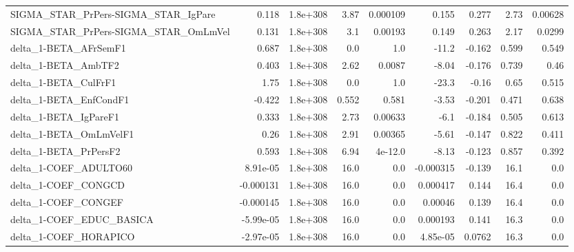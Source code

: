 \begin{tabular}{lrrrrrrrr}
SIGMA\_STAR\_PrPers-SIGMA\_STAR\_IgPare   &       0.118 &     1.8e+308 &    3.87 & 0.000109 &      0.155 &       0.277 &         2.73 &       0.00628 \\
SIGMA\_STAR\_PrPers-SIGMA\_STAR\_OmLmVel  &       0.131 &     1.8e+308 &     3.1 &  0.00193 &      0.149 &       0.263 &         2.17 &        0.0299 \\
delta\_1-BETA\_AFrSemF1                 &       0.687 &     1.8e+308 &     0.0 &      1.0 &      -11.2 &      -0.162 &        0.599 &         0.549 \\
delta\_1-BETA\_AmbTF2                   &       0.403 &     1.8e+308 &    2.62 &   0.0087 &      -8.04 &      -0.176 &        0.739 &          0.46 \\
delta\_1-BETA\_CulFrF1                  &        1.75 &     1.8e+308 &     0.0 &      1.0 &      -23.3 &       -0.16 &         0.65 &         0.515 \\
delta\_1-BETA\_EnfCondF1                &      -0.422 &     1.8e+308 &   0.552 &    0.581 &      -3.53 &      -0.201 &        0.471 &         0.638 \\
delta\_1-BETA\_IgPareF1                 &       0.333 &     1.8e+308 &    2.73 &  0.00633 &       -6.1 &      -0.184 &        0.505 &         0.613 \\
delta\_1-BETA\_OmLmVelF1                &        0.26 &     1.8e+308 &    2.91 &  0.00365 &      -5.61 &      -0.147 &        0.822 &         0.411 \\
delta\_1-BETA\_PrPersF2                 &       0.593 &     1.8e+308 &    6.94 &  4e-12.0 &      -8.13 &      -0.123 &        0.857 &         0.392 \\
delta\_1-COEF\_ADULTO60                 &    8.91e-05 &     1.8e+308 &    16.0 &      0.0 &  -0.000315 &      -0.139 &         16.1 &           0.0 \\
delta\_1-COEF\_CONGCD                   &   -0.000131 &     1.8e+308 &    16.0 &      0.0 &   0.000417 &       0.144 &         16.4 &           0.0 \\
delta\_1-COEF\_CONGEF                   &   -0.000145 &     1.8e+308 &    16.0 &      0.0 &    0.00046 &       0.139 &         16.4 &           0.0 \\
delta\_1-COEF\_EDUC\_BASICA              &   -5.99e-05 &     1.8e+308 &    16.0 &      0.0 &   0.000193 &       0.141 &         16.3 &           0.0 \\
delta\_1-COEF\_HORAPICO                 &   -2.97e-05 &     1.8e+308 &    16.0 &      0.0 &   4.85e-05 &      0.0762 &         16.3 &           0.0 \\

\end{tabular}
